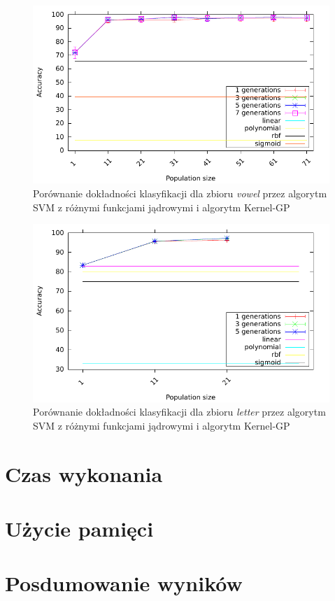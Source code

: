 	\begin{figure}
		\includegraphics[scale=0.90]{figures/accuracy/accuracy-vowel-svm}
		\caption{Porównanie dokładności klasyfikacji dla zbioru \emph{vowel} przez algorytm SVM z różnymi funkcjami jądrowymi i algorytm Kernel-GP\label{fig:acc-vowel-svm}}
	\end{figure}
	
	\begin{figure}
		\includegraphics[scale=0.90]{figures/accuracy/accuracy-letter-svm}
		\caption{Porównanie dokładności klasyfikacji dla zbioru \emph{letter} przez algorytm SVM z różnymi funkcjami jądrowymi i algorytm Kernel-GP\label{fig:acc-letter-svm}}
	\end{figure}		
		

\section{Czas wykonania}

\section{Użycie pamięci}

\section{Posdumowanie wyników}

\clearpage
